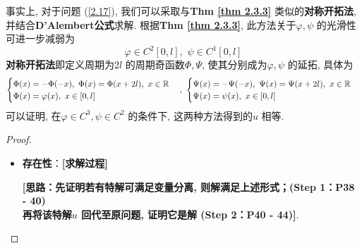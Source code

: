 \begin{thm}
		\begin{rmk}
			事实上, 对于问题 (\ref{2.17}), 我们可以采取与\textbf{Thm \ref{thm 2.3.3}} 类似的\textbf{对称开拓法}, 并结合\textbf{D'Alembert公式}求解. 根据\textbf{Thm \ref{thm 2.3.3}}, 此方法关于$\varphi , \psi$ 的光滑性可进一步减弱为
			\[ \varphi \in C^2[0 , l] , \,\, \psi \in C^1[0 , l] \]
			\textbf{对称开拓法}即定义周期为$2l$ 的周期奇函数$\Phi , \Psi$, 使其分别成为$\varphi , \psi$ 的延拓, 具体为
			\begin{align*}
				\begin{cases}
					\Phi(x) = -\Phi(-x) , \,\, \Phi(x) = \Phi(x + 2l) , \,\, x \in \mathbb{R} \\
					\Phi(x) = \varphi(x) , \,\, x \in [0 , l]
				\end{cases} , \,\, 
				\begin{cases}
					\Psi(x) = -\Psi(-x) , \,\, \Psi(x) = \Psi(x + 2l) , \,\, x \in \mathbb{R} \\
					\Psi(x) = \psi(x) , \,\, x \in [0 , l]
				\end{cases}
			\end{align*}
			可以证明, 在$\varphi \in C^3 , \psi \in C^2$ 的条件下, 这两种方法得到的$u$ 相等. 
		\end{rmk}
		
		\newpage
		
		\begin{proof}
			\begin{itemize}
				\item \textbf{存在性}：\textbf{[求解过程]}
				\begin{center}
					\textbf{[思路：先证明若有特解可满足变量分离, 则解满足上述形式；(Step 1：P38 - 40)\\
						再将该特解$u$ 回代至原问题, 证明它是解 (Step 2：P40 - 44)]}. 
				\end{center}
				

\end{itemize}
\end{proof}
\end{thm}
